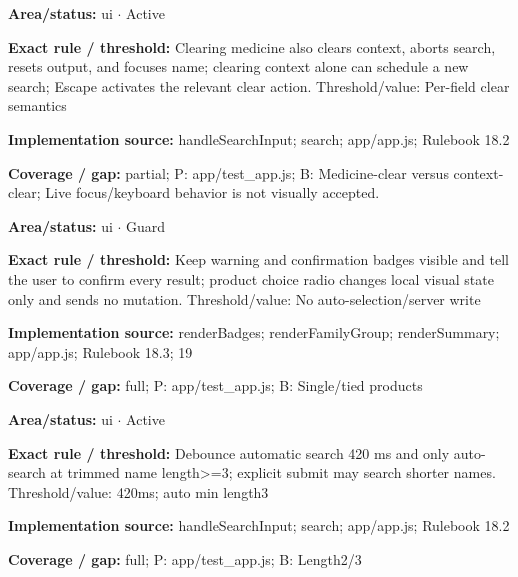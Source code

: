 \begin{tcolorbox}[enhanced,breakable,colback=white,colframe=Muted!45,boxrule=0.45pt,arc=1.5pt,left=6pt,right=6pt,top=5pt,bottom=5pt,title={\texttt{UI-CLEAR-11}},title after break={\texttt{UI-CLEAR-11}\ (continued)},fonttitle=\headingfont\bfseries\color{Navy},coltitle=Navy]
\textbf{Area/status:} ui $\boldsymbol{\cdot}$ Active\par
\smallskip
\textbf{Exact rule / threshold:} Clearing medicine also clears context, aborts search, resets output, and focuses name; clearing context alone can schedule a new search; Escape activates the relevant clear action. Threshold/\allowbreak{}value: Per-field clear semantics\par
\smallskip
\textbf{Implementation source:} handleSearchInput; search; app/\allowbreak{}app.js; Rulebook 18.2\par
\smallskip
\textbf{Coverage / gap:} partial; P: app/\allowbreak{}test\_\allowbreak{}app.js; B: Medicine-clear versus context-clear; Live focus/\allowbreak{}keyboard behavior is not visually accepted.
\end{tcolorbox}
\begin{tcolorbox}[enhanced,breakable,colback=white,colframe=Muted!45,boxrule=0.45pt,arc=1.5pt,left=6pt,right=6pt,top=5pt,bottom=5pt,title={\texttt{UI-CONFIRM-SAFETY-14}},title after break={\texttt{UI-CONFIRM-SAFETY-14}\ (continued)},fonttitle=\headingfont\bfseries\color{Navy},coltitle=Navy]
\textbf{Area/status:} ui $\boldsymbol{\cdot}$ Guard\par
\smallskip
\textbf{Exact rule / threshold:} Keep warning and confirmation badges visible and tell the user to confirm every result; product choice radio changes local visual state only and sends no mutation. Threshold/\allowbreak{}value: No auto-selection/\allowbreak{}server write\par
\smallskip
\textbf{Implementation source:} renderBadges; renderFamilyGroup; renderSummary; app/\allowbreak{}app.js; Rulebook 18.3; 19\par
\smallskip
\textbf{Coverage / gap:} full; P: app/\allowbreak{}test\_\allowbreak{}app.js; B: Single/\allowbreak{}tied products
\end{tcolorbox}
\begin{tcolorbox}[enhanced,breakable,colback=white,colframe=Muted!45,boxrule=0.45pt,arc=1.5pt,left=6pt,right=6pt,top=5pt,bottom=5pt,title={\texttt{UI-DEBOUNCE-02}},title after break={\texttt{UI-DEBOUNCE-02}\ (continued)},fonttitle=\headingfont\bfseries\color{Navy},coltitle=Navy]
\textbf{Area/status:} ui $\boldsymbol{\cdot}$ Active\par
\smallskip
\textbf{Exact rule / threshold:} Debounce automatic search 420 ms and only auto-search at trimmed name length>=3; explicit submit may search shorter names. Threshold/\allowbreak{}value: 420ms; auto min length3\par
\smallskip
\textbf{Implementation source:} handleSearchInput; search; app/\allowbreak{}app.js; Rulebook 18.2\par
\smallskip
\textbf{Coverage / gap:} full; P: app/\allowbreak{}test\_\allowbreak{}app.js; B: Length2/\allowbreak{}3
\end{tcolorbox}
